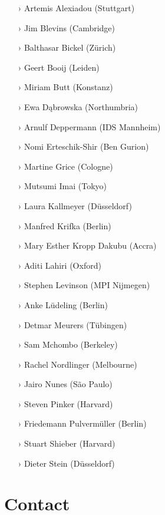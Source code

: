 \documentclass[
notumble,
nofoldmark,
]{leaflet}
\begin{document}
\begin{itemize}
\setlength{\itemsep}{-3pt} 
 \item[›] Artemis Alexiadou (Stuttgart)
 \item[›] Jim Blevins (Cambridge)
 \item[›] Balthasar Bickel (Z\"urich)
 \item[›] Geert Booij (Leiden)
 \item[›] Miriam Butt (Konstanz)
 \item[›] Ewa D\k{a}browska (Northumbria)
 \item[›] Arnulf Deppermann (IDS Mannheim)
 \item[›] Nomi Erteschik-Shir (Ben Gurion)
 \item[›] Martine Grice (Cologne)
 \item[›] Mutsumi Imai (Tokyo)
 \item[›] Laura Kallmeyer (D\"usseldorf)
 \item[›] Manfred Krifka (Berlin)
 \item[›] Mary Esther Kropp Dakubu (Accra)
 \item[›] Aditi Lahiri (Oxford)
 \item[›] Stephen Levinson (MPI Nijmegen)
 \item[›] Anke L\"udeling (Berlin)
 \item[›] Detmar Meurers (T\"ubingen)
 \item[›] Sam Mchombo (Berkeley)
 \item[›] Rachel Nordlinger (Melbourne)
 \item[›] Jairo Nunes (S\~ao Paulo)
 \item[›] Steven Pinker (Harvard)
 \item[›] Friedemann Pulverm\"uller (Berlin)
 \item[›] Stuart Shieber (Harvard)
 \item[›] Dieter Stein (D\"usseldorf)  
\end{itemize}

\section{\sffamily\Large\bfseries Contact}  
\end{document}
